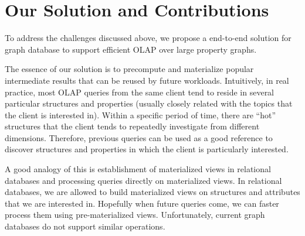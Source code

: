 	


\section{Our Solution and Contributions}
To address the challenges discussed above, we propose a end-to-end solution for graph database to  support efficient  OLAP over large property graphs.

The essence of our solution is to precompute and materialize popular intermediate results that can be reused by future workloads. Intuitively, in real practice, most OLAP queries from the same client   tend to reside in several particular structures and properties (usually closely related with the topics that the client is interested in). Within a specific period of time, there are ``hot'' structures that the client tends to repeatedly investigate from different dimensions. Therefore, previous queries can be used as a good reference to discover structures and properties in which the client is particularly interested.





A good analogy of this is establishment of materialized views in relational databases and processing queries directly on materialized views. In relational databases, we are allowed to build materialized views on structures and attributes that we are interested in. Hopefully when future queries come, we can faster process them using pre-materialized views. Unfortunately, current graph databases do not support similar operations.

